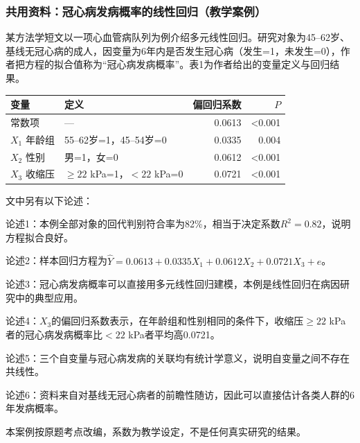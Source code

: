 \subsubsection*{共用资料：冠心病发病概率的线性回归（教学案例）}

某方法学短文以一项心血管病队列为例介绍多元线性回归。研究对象为45--62岁、基线无冠心病的成人，因变量为6年内是否发生冠心病（发生=1，未发生=0），作者把方程的拟合值称为``冠心病发病概率''。表1为作者给出的变量定义与回归结果。

\begin{center}\small\setlength{\tabcolsep}{4pt}\renewcommand{\arraystretch}{1.18}\begin{tabular}{@{}llrr@{}}
\toprule
变量 & 定义 & 偏回归系数 & \(P\) \\
\midrule
常数项 & --- & 0.0613 & \textless0.001 \\
\(X_1\) 年龄组 & 55--62岁=1，45--54岁=0 & 0.0335 & 0.004 \\
\(X_2\) 性别 & 男=1，女=0 & 0.0612 & \textless0.001 \\
\(X_3\) 收缩压 & \(\ge22\) kPa=1，\(<22\) kPa=0 & 0.0721 & \textless0.001 \\
\bottomrule\end{tabular}\end{center}

文中另有以下论述：

论述1：本例全部对象的回代判别符合率为82\%，相当于决定系数\(R^2=0.82\)，说明方程拟合良好。

论述2：样本回归方程为\(\hat Y=0.0613+0.0335X_1+0.0612X_2+0.0721X_3+e\)。

论述3：冠心病发病概率可以直接用多元线性回归建模，本例是线性回归在病因研究中的典型应用。

论述4：\(X_3\)的偏回归系数表示，在年龄组和性别相同的条件下，收缩压\(\ge22\) kPa者的冠心病发病概率比\(<22\) kPa者平均高0.0721。

论述5：三个自变量与冠心病发病的关联均有统计学意义，说明自变量之间不存在共线性。

论述6：资料来自对基线无冠心病者的前瞻性随访，因此可以直接估计各类人群的6年发病概率。

本案例按原题考点改编，系数为教学设定，不是任何真实研究的结果。


